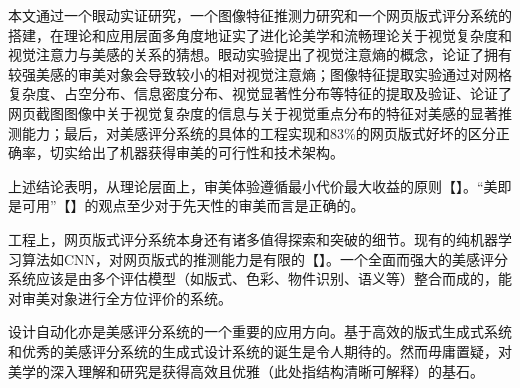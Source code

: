 
\begin{summary}

本文通过一个眼动实证研究，一个图像特征推测力研究和一个网页版式评分系统的搭建，在理论和应用层面多角度地证实了进化论美学和流畅理论关于视觉复杂度和视觉注意力与美感的关系的猜想。眼动实验提出了视觉注意熵的概念，论证了拥有较强美感的审美对象会导致较小的相对视觉注意熵；图像特征提取实验通过对网格复杂度、占空分布、信息密度分布、视觉显著性分布等特征的提取及验证、论证了网页截图图像中关于视觉复杂度的信息与关于视觉重点分布的特征对美感的显著推测能力；最后，对美感评分系统的具体的工程实现和83\%的网页版式好坏的区分正确率，切实给出了机器获得审美的可行性和技术架构。

上述结论表明，从理论层面上，审美体验遵循最小代价最大收益的原则【】。“美即是可用”【】的观点至少对于先天性的审美而言是正确的。

工程上，网页版式评分系统本身还有诸多值得探索和突破的细节。现有的纯机器学习算法如CNN，对网页版式的推测能力是有限的【】。一个全面而强大的美感评分系统应该是由多个评估模型（如版式、色彩、物件识别、语义等）整合而成的，能对审美对象进行全方位评价的系统。

设计自动化亦是美感评分系统的一个重要的应用方向。基于高效的版式生成式系统和优秀的美感评分系统的生成式设计系统的诞生是令人期待的。然而毋庸置疑，对美学的深入理解和研究是获得高效且优雅（此处指结构清晰可解释）的基石。

\end{summary}
